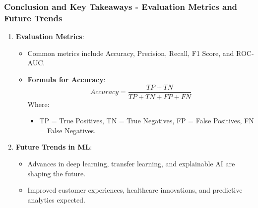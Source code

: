 \documentclass[aspectratio=169]{beamer}
\begin{document}
\begin{frame}[fragile]
    \frametitle{Conclusion and Key Takeaways - Evaluation Metrics and Future Trends}
    \begin{enumerate}[resume]
        \item \textbf{Evaluation Metrics}:
            \begin{itemize}
                \item Common metrics include Accuracy, Precision, Recall, F1 Score, and ROC-AUC.
                \item \textbf{Formula for Accuracy}:
                \begin{equation}
                    Accuracy = \frac{TP + TN}{TP + TN + FP + FN}
                \end{equation}
                Where:
                \begin{itemize}
                    \item TP = True Positives, TN = True Negatives, FP = False Positives, FN = False Negatives.
                \end{itemize}
            \end{itemize}

        \item \textbf{Future Trends in ML}:
            \begin{itemize}
                \item Advances in deep learning, transfer learning, and explainable AI are shaping the future.
                \item Improved customer experiences, healthcare innovations, and predictive analytics expected.
            \end{itemize}
    \end{enumerate}
\end{frame}
\end{document}
